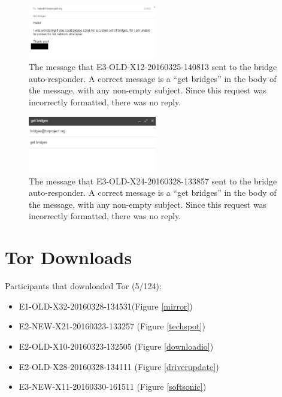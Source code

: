 \documentclass[USenglish,oneside,twocolumn]{article}
\begin{document}
\begin{figure}[h]
\label{autoresponder2}
\includegraphics[width=0.5\textwidth]{../experiment/processing/failed-participants/20160328-133857-bridgeresponder-redacted.png}
\caption{The message that E3-OLD-X12-20160325-140813 sent to the bridge auto-responder. A correct message is a ``get bridges'' in the body of the message, with any non-empty subject. Since this request was incorrectly formatted, there was no reply.}
\end{figure} 

\begin{figure}[h]
\label{autoresponder3}
\includegraphics[width=0.5\textwidth]{../experiment/processing/failed-participants/20160328-155924-bridgeresponder.png}
\caption{The message that E3-OLD-X24-20160328-133857 sent to the bridge auto-responder. A correct message is a ``get bridges'' in the body of the message, with any non-empty subject. Since this request was incorrectly formatted, there was no reply.}
\end{figure} 

\section{Tor Downloads}
\label{tor-downloads}

Participants that downloaded Tor (5/124): 
\begin{itemize}
\item E1-OLD-X32-20160328-134531(Figure \ref{mirror})
\item E2-NEW-X21-20160323-133257 (Figure \ref{techspot})
\item E2-OLD-X10-20160323-132505 (Figure \ref{downloadio})
\item E2-OLD-X28-20160328-134111 (Figure \ref{driverupdate})
\item E3-NEW-X11-20160330-161511 (Figure \ref{softsonic})
\end{itemize} 
\end{document}
